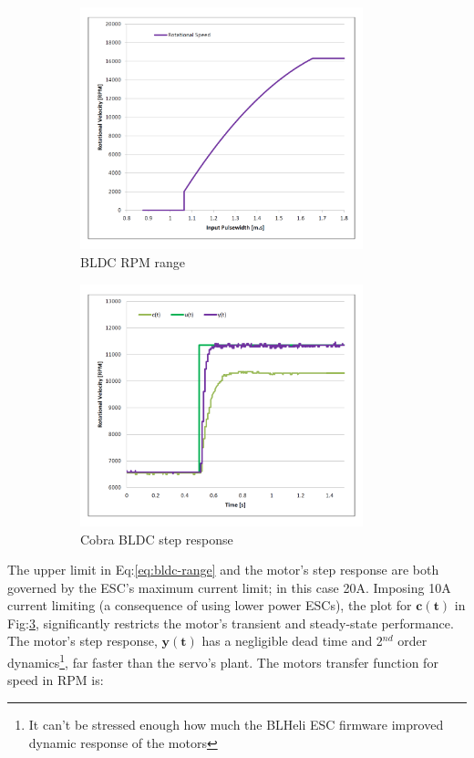 \begin{figure}[hbtp]
\begin{subfigure}{0.5\textwidth}
\centering
\includegraphics[width=0.9\textwidth]{graphs/bldc-range}
\caption{BLDC RPM range}
\label{fig:bldc-range}
\end{subfigure}
\begin{subfigure}{0.5\textwidth}
\centering
\includegraphics[width=0.9\textwidth]{graphs/BLDC-step}
\caption{Cobra BLDC step response}
\label{fig:bldc-step}
\end{subfigure}
\caption{}
\end{figure}
The upper limit in Eq:\ref{eq:bldc-range} and the motor's step response are both governed by the ESC's maximum current limit; in this case 20A. Imposing 10A current limiting (a consequence of using lower power ESCs), the plot for {\color{YellowGreen}$\mathbf{c(t)}$} in Fig:\ref{fig:bldc-step}, significantly restricts the motor's transient and steady-state performance. The motor's step response, {\color{Purple}$\mathbf{y(t)}$} has a negligible dead time and 2$^{nd}$ order dynamics\footnote{It can't be stressed enough how much the BLHeli ESC firmware improved dynamic response of the motors}, far faster than the servo's plant. The motors transfer function for speed in RPM is:
